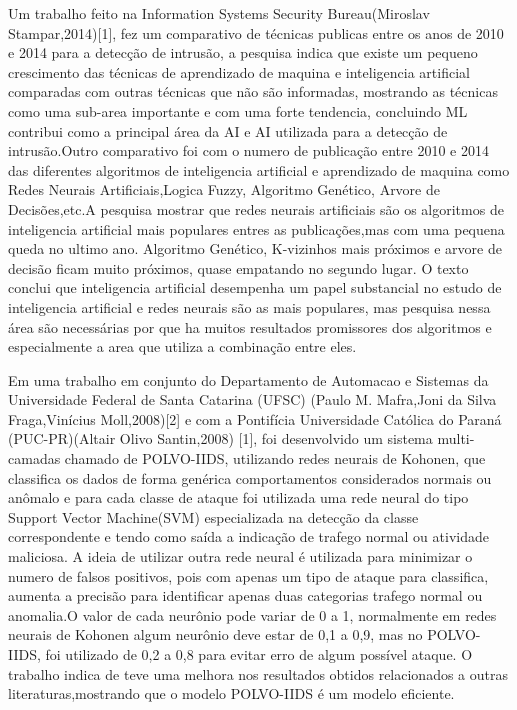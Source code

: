 \documentclass[
	12pt,				%
	openright,			%
	oneside,
	a4paper,			%
	english,			%
	french,				%
	spanish,			%
	brazil				%
	]{abntex2}
\begin{document}
Um trabalho feito na Information Systems Security Bureau(Miroslav Stampar,2014)[1], fez um comparativo de técnicas publicas entre os anos de 2010 e 2014 para a detecção de intrusão, a pesquisa indica que existe um pequeno crescimento das técnicas de aprendizado de maquina e inteligencia artificial comparadas com outras técnicas que não são informadas, mostrando as técnicas como uma sub-area importante e com uma forte tendencia, concluindo ML contribui como a principal área da AI e AI utilizada para a detecção de intrusão.Outro comparativo foi com o numero de publicação entre 2010 e 2014 das diferentes algoritmos de inteligencia artificial e aprendizado de maquina como Redes Neurais Artificiais,Logica Fuzzy, Algoritmo Genético, Arvore de Decisões,etc.A pesquisa mostrar que redes neurais artificiais são os algoritmos de inteligencia artificial mais populares entres as publicações,mas com uma pequena queda no ultimo ano. Algoritmo Genético, K-vizinhos mais próximos e arvore de decisão ficam muito próximos, quase empatando no segundo lugar. O texto conclui que inteligencia artificial desempenha um papel substancial no estudo de inteligencia artificial e redes neurais são as mais populares, mas pesquisa nessa área são necessárias por que ha muitos resultados promissores dos algoritmos e especialmente a area que utiliza a combinação entre eles.

Em uma trabalho em conjunto do Departamento de Automacao e Sistemas da Universidade Federal de Santa Catarina (UFSC) 
(Paulo M. Mafra,Joni da Silva Fraga,Vinícius Moll,2008)[2] e com a Pontifícia Universidade Católica do Paraná (PUC-PR)(Altair Olivo Santin,2008)
[1], foi desenvolvido um sistema multi-camadas chamado de POLVO-IIDS, utilizando redes neurais de Kohonen, que classifica os dados de forma
genérica comportamentos considerados normais ou anômalo e para cada classe de ataque foi utilizada uma
rede neural do tipo Support Vector Machine(SVM) especializada na detecção da classe correspondente e tendo como saída a indicação de trafego normal ou atividade maliciosa.
A ideia de utilizar outra rede neural é utilizada para minimizar o numero de falsos positivos, pois com apenas um tipo de ataque para classifica, aumenta a precisão para identificar 
apenas duas categorias trafego normal ou anomalia.O valor de cada neurônio pode variar de 0 a 1, normalmente em redes neurais de Kohonen algum neurônio deve estar de 0,1 a 0,9,
mas no POLVO-IIDS, foi utilizado de 0,2 a 0,8 para evitar erro de algum possível ataque. O trabalho indica de teve uma melhora nos resultados obtidos relacionados a outras literaturas,mostrando que o modelo POLVO-IIDS é um modelo eficiente.
\end{document}
